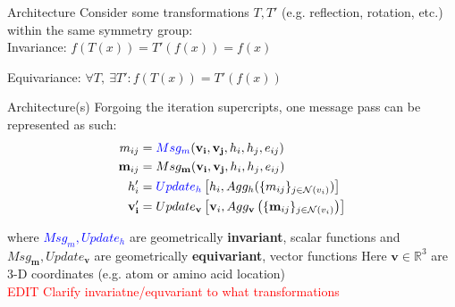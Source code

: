 \documentclass{beamer}
\newcommand{\nhood}{\mathcal{N}}
\newcommand{\node}{v}
\newcommand{\nrepresent}{h}
\newcommand{\edge}{e}
\begin{document}
\begin{frame}{Architecture}
Consider some transformations $T, T'$ (e.g. reflection, rotation, etc.) within the same symmetry group: \newline 
\vspace{3mm} 
\\ 

Invariance: $f(T(x)) = T'(f(x)) = f(x)$
\\
\vspace{6mm}

Equivariance: 
$\forall  T, \  \exists T': f(T(x)) = T'(f(x))$

\end{frame}

\begin{frame}{Architecture(s)}
Forgoing the iteration supercripts, one message pass can be represented as such: 
    \begin{align*}
        m_{ij}
        &=
        \textcolor{blue}{Msg_m}(\mathbf{\node_i}, \mathbf{\node_j}, \nrepresent_i, \nrepresent_j, \edge_{ij}) 
    \\ 
        \mathbf{m}_{ij}
        &=
        Msg_{\mathbf{m}}
        (\mathbf{\node_i}, \mathbf{\node_j}, \nrepresent_i, \nrepresent_j, \edge_{ij})
    \\
        \nrepresent_i'
        &=
        \textcolor{blue}{Update_\nrepresent}
        \left[
            \nrepresent_i
            , 
            Agg_h
            (
                \{m_{ij}\}_{j \in \nhood(\node_i)}
            )
        \right]     
    \\
        \mathbf{\node_i'}
        &=
        Update_{\mathbf\node}
        \left[
            \mathbf{\node}_i
            , 
            Agg_\mathbf{\node}
            \left( 
                \{\mathbf{m}_{ij}\}_{j \in \nhood(\node_i)}
            \right)
        \right]
    \end{align*}

    where \textcolor{blue}{$Msg_m, Update_h$} are geometrically {\bf invariant}, scalar functions and $Msg_{\mathbf{m}}, Update_{\mathbf\node}$ are geometrically {\bf equivariant}, vector functions \newline 
    Here $\mathbf\node \in \mathbb{R}^3$ are 3-D coordinates (e.g. atom or amino acid location)\\
    \textcolor{red}{EDIT Clarify invariatne/equvariant to what transformations}
\end{frame}
\end{document}
